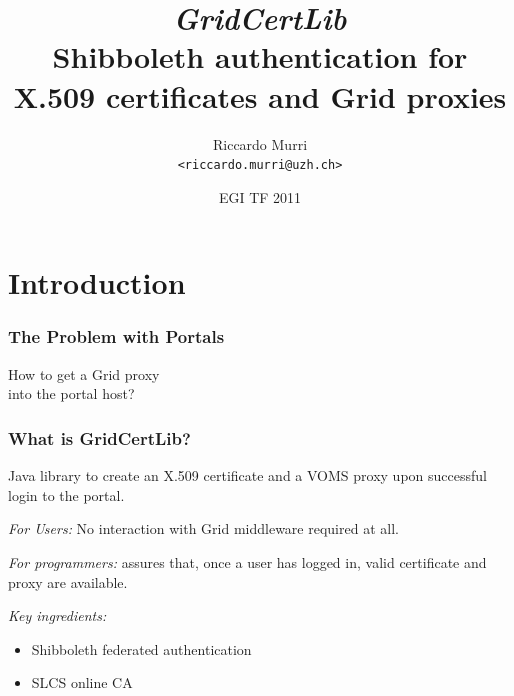 \documentclass{beamer}
\title[GridCertLib]{%
  \emph{GridCertLib} 
  \\
  Shibboleth authentication for X.509 certificates and Grid proxies
}
\author[R.\ Murri]{Riccardo Murri
  \\ \texttt{<riccardo.murri@uzh.ch>}}%
\institute[GC3, University of Zurich]%
{\href{http://www.gc3.uzh.ch/}{Grid Computing Competence Centre}, 
  \\ \href{http://www.uzh.ch/}{University of Zurich}
  \\ \url{http://www.gc3.uzh.ch/}}%
\date{EGI TF 2011}%
\newcommand{\+}{\vspace{1em}}
\begin{document}
\begin{frame}
\maketitle
\end{frame}



\section[Introduction]{Introduction}

\begin{frame}
  \frametitle{The Problem with Portals}
  \begin{center}
    {\Huge How to get a Grid proxy \\ into the portal host?}
  \end{center}
\end{frame}



  



\begin{frame}
  \frametitle{What is GridCertLib?}
  
  Java library to create an X.509 certificate and a VOMS proxy upon
  successful login to the portal.

  \+ 
  \emph{For Users:} No interaction with Grid middleware required at all.

  \+
  \emph{For programmers:} assures that, once a user has logged in, valid
  certificate and proxy are available.

  \+
  \emph{Key ingredients:}
  \begin{itemize}
  \item Shibboleth federated authentication
  \item SLCS online CA
  \end{itemize}

\end{frame}
\end{document}
